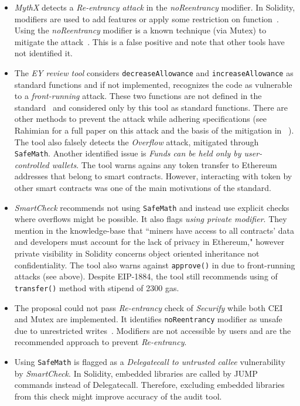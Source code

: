 \begin{itemize}
	\item \textit{MythX} detects a \textit{Re-entrancy attack} in the \textit{noReentrancy} modifier. In Solidity, modifiers are used to add features or apply some restriction on function~\cite{SolidityModifer}. Using the \textit{noReentrancy} modifier is a known technique (via Mutex) to mitigate the attack~\cite{ReentrancyGuard}. This is a false positive and note that other tools have not identified it.
	\item The \textit{EY review tool} considers \texttt{decreaseAllowance} and \texttt{increaseAllowance} as standard \erc functions and if not implemented, recognizes the code as vulnerable to a \textit{front-running} attack. These two functions are not defined in the \erc standard~\cite{ERC20Std} and considered only by this tool as standard \erc functions. There are other methods to prevent the attack while adhering \erc specifications (see Rahimian \etal for a full paper on this attack and the basis of the mitigation in \sys~\cite{ERC20MWA}). The tool also falsely detects the \textit{Overflow} attack, mitigated through \texttt{SafeMath}. Another identified issue is \textit{Funds can be held only by user-controlled wallets}. The tool warns agains any token transfer to Ethereum addresses that belong to smart contracts. However, interacting with \erc token by other smart contracts was one of the main motivations of the \erc standard.
	\item \textit{SmartCheck} recommends not using \texttt{SafeMath} and instead use explicit checks where overflows might be possible. It also flags \textit{using private modifier}. They mention in the knowledge-base that ``miners have access to all contracts’ data and developers must account for the lack of privacy in Ethereum," however private visibility in Solidity concerns object oriented inheritance not confidentiality. The tool also warns against \texttt{approve()} in \erc due to front-running attacks (see above). Despite EIP-1884, the tool still recommends using of \texttt{transfer()} method with stipend of 2300 gas.
	\item The proposal could not pass \textit{Re-entrancy} check of \textit{Securify} while both CEI and Mutex are implemented. It identifies \texttt{noReentrancy} modifier as unsafe due to unrestricted writes~\cite{SECURIFY}. Modifiers are not accessible by users and are the recommended approach to prevent \textit{Re-entrancy}.
	\item Using \texttt{SafeMath} is flagged as a \textit{Delegatecall to untrusted callee} vulnerability by \textit{SmartCheck}. In Solidity, embedded libraries are called by JUMP commands instead of Delegatecall. Therefore, excluding embedded libraries from this check might improve accuracy of the audit tool.
\end{itemize}


